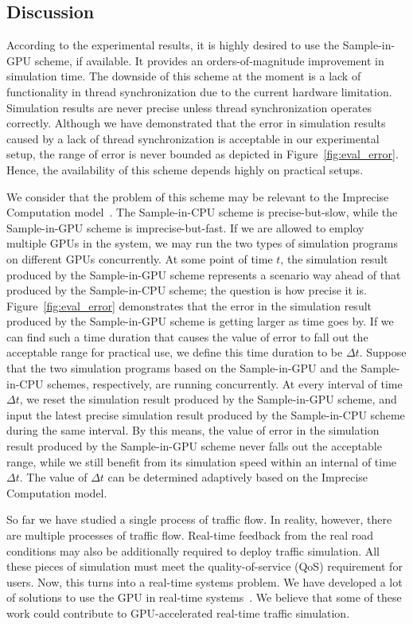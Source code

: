\documentclass[times, 10pt, twocolumn]{article}
\begin{document}
\subsection{Discussion}
\label{sec:discussion}

According to the experimental results, it is highly desired to use the
Sample-in-GPU scheme, if available.
It provides an orders-of-magnitude improvement in simulation time.
The downside of this scheme at the moment is a lack of functionality in
thread synchronization due to the current hardware limitation.
Simulation results are never precise unless thread synchronization
operates correctly.
Although we have demonstrated that the error in simulation results
caused by a lack of thread synchronization is acceptable in our
experimental setup, the range of error is never bounded as depicted in
Figure~\ref{fig:eval_error}.
Hence, the availability of this scheme depends highly on practical
setups.

We consider that the problem of this scheme may be relevant to the
Imprecise Computation model~\cite{Lin1987}.
The Sample-in-CPU scheme is precise-but-slow, while the Sample-in-GPU
scheme is imprecise-but-fast.
If we are allowed to employ multiple GPUs in the system, we may run the
two types of simulation programs on different GPUs concurrently.
At some point of time $t$, the simulation result produced by the
Sample-in-GPU scheme represents a scenario way ahead of that produced by
the Sample-in-CPU scheme; the question is how precise it is.
Figure~\ref{fig:eval_error} demonstrates that the error in the
simulation result produced by the Sample-in-GPU scheme is getting larger
as time goes by.
If we can find such a time duration that causes the value of error to
fall out the acceptable range for practical use, we define this time
duration to be $\Delta t$.
Suppose that the two simulation programs based on the Sample-in-GPU and
the Sample-in-CPU schemes, respectively, are running concurrently.
At every interval of time $\Delta t$, we reset the simulation result
produced by the Sample-in-GPU scheme, and input the latest precise
simulation result produced by the Sample-in-CPU scheme during the same
interval.
By this means, the value of error in the simulation result produced by
the Sample-in-GPU scheme never falls out the acceptable range, while we
still benefit from its simulation speed within an internal of time
$\Delta t$.
The value of $\Delta t$ can be determined adaptively based on the
Imprecise Computation model.

So far we have studied a single process of traffic flow.
In reality, however, there are multiple processes of traffic flow.
Real-time feedback from the real road conditions may also be
additionally required to deploy traffic simulation.
All these pieces of simulation must meet the quality-of-service (QoS)
requirement for users.
Now, this turns into a real-time systems problem.
We have developed a lot of solutions to use the GPU in real-time
systems~\cite{Kato2011_3, Kato2011_2, Kato2011_1, Kato2012}.
We believe that some of these work could contribute to GPU-accelerated
real-time traffic simulation.
\end{document}
